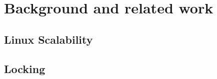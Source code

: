 \section{Background and related work} \label{sec:Background}
\subsection{Linux Scalability}

 


\subsection{Locking}

